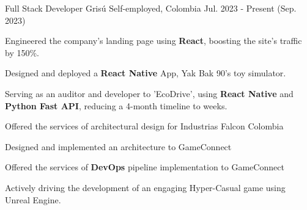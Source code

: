 \newcommand{\quotes}[1]{``#1''}

\begin{cventries}

  \cventry
  {Full Stack Developer} %
  {Grisú} %
  {Self-employed, Colombia} %
  {Jul. 2023 - Present (Sep. 2023)} %
  {
    \begin{cvitems} %
      \item {Engineered the company's landing page using \textbf{React}, boosting the site's traffic by 150\%.}
      \item {Designed and deployed a \textbf{React Native} App, Yak Bak 90's toy simulator.}
      \item {Serving as an auditor and developer to 'EcoDrive', using \textbf{React Native} and \textbf{Python Fast API}, reducing a 4-month timeline to weeks.}
      \item {Offered the services of architectural design for Industrias Falcon Colombia}
      \item {Designed and implemented an architecture to GameConnect}
      \item {Offered the services of \textbf{DevOps} pipeline implementation to GameConnect}
      \item {Actively driving the development of an engaging Hyper-Casual game using Unreal Engine.}
    \end{cvitems}
  }


\end{cventries}
